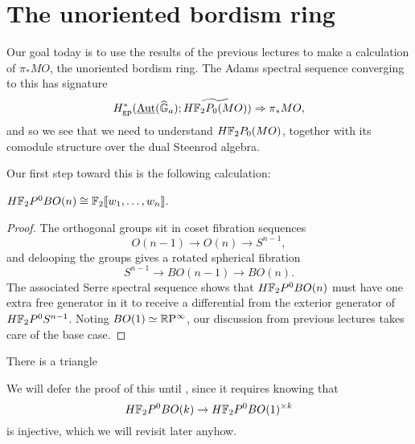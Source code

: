 








\section{The unoriented bordism ring}

Our goal today is to use the results of the previous lectures to make a calculation of $\pi_* MO$, the unoriented bordism ring.  The Adams spectral sequence converging to this has signature \[H^*_{\mathrm{gp}}(\operatorname{\underline{\smash{\operatorname{Aut}}}}(\widehat{\mathbb G}_a); \widetilde{H\mathbb F_2P_0(MO)}) \Rightarrow \pi_* MO,\] and so we see that we need to understand $H\mathbb F_2P_0(MO)$, together with its comodule structure over the dual Steenrod algebra.

Our first step toward this is the following calculation:
\begin{lemma}
$H\mathbb F_2P^0 BO(n) \cong \mathbb F_2 \llbracket w_1, \ldots, w_n \rrbracket$.
\end{lemma}
\begin{proof}
The orthogonal groups sit in coset fibration sequences \[O(n-1) \to O(n) \to S^{n-1},\] and delooping the groups gives a rotated spherical fibration \[S^{n-1} \to BO(n-1) \to BO(n).\]  The associated Serre spectral sequence shows that $H\mathbb F_2P^0 BO(n)$ must have one extra free generator in it to receive a differential from the exterior generator of $H\mathbb F_2P^0 S^{n-1}$.  Noting $BO(1) \simeq \mathbb R\mathrm P^\infty$, our discussion from previous lectures takes care of the base case.
\end{proof}

\begin{corollary}
There is a triangle
\begin{center}
\end{center}
\end{corollary}
\noindent We will defer the proof of this until , since it requires knowing that \[H\mathbb F_2P^0 BO(k) \to H\mathbb F_2P^0 BO(1)^{\times k}\] is injective, which we will revisit later anyhow.

